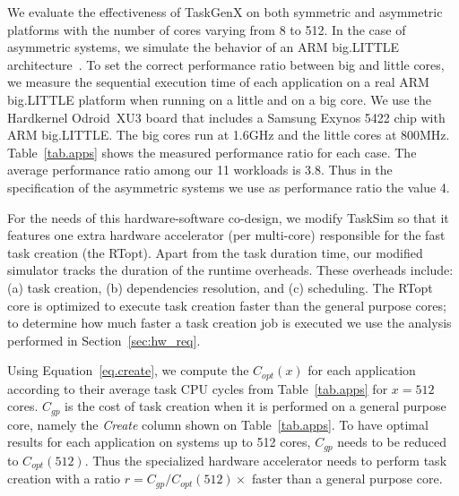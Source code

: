 We evaluate the effectiveness of TaskGenX on both symmetric and asymmetric platforms with the number of cores varying from 8 to 512.
In the case of asymmetric systems, we simulate the behavior of an ARM big.LITTLE architecture~\cite{ARM}.
To set the correct performance ratio between big and little cores, we measure the sequential execution time of each application on a real ARM big.LITTLE platform when running on a little and on a big core. 
We use the Hardkernel Odroid~XU3 board that includes a Samsung Exynos 5422 chip with ARM big.LITTLE.
The big cores run at 1.6GHz and the little cores at 800MHz.
Table~\ref{tab.apps} shows the measured performance ratio for each case.
The average performance ratio among our 11 workloads is 3.8.
Thus in the specification of the asymmetric systems we use as performance ratio the value 4.


For the needs of this hardware-software co-design, we modify TaskSim so that it features one extra hardware accelerator (per multi-core) responsible for the fast task creation (the RTopt).
Apart from the task duration time, our modified simulator tracks the duration of the runtime overheads.
These overheads include: (a) task creation, (b) dependencies resolution, and (c) scheduling.
The RTopt core is optimized to execute task creation faster than the general purpose cores; 
to determine how much faster a task creation job is executed we use the analysis performed in Section~\ref{sec:hw_req}.

Using Equation~\ref{eq.create}, we compute the $C_{opt}(x)$ for each application according to their average task CPU cycles from Table~\ref{tab.apps} for $x=512$ cores.
$C_{gp}$ is the cost of task creation when it is performed on a general purpose core, namely the \textit{Create} column shown on Table~\ref{tab.apps}.
To have optimal results for each application on systems up to 512 cores, $C_{gp}$ needs to be reduced to $C_{opt}(512)$.
Thus the specialized hardware accelerator needs to perform task creation with a ratio $r = C_{gp}/C_{opt}(512) \times$ faster than a general purpose core.

